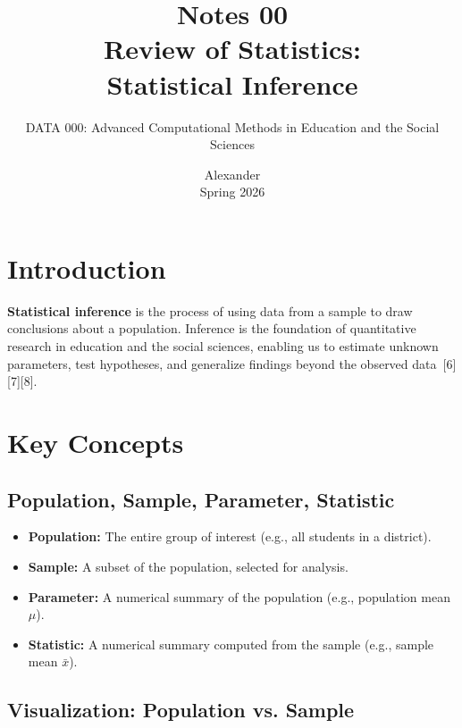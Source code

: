\documentclass[11pt]{article}
\title{Notes 00 \\ Review of Statistics: \\ Statistical Inference}
\author{DATA 000: Advanced Computational Methods in Education and the Social Sciences}
\date{Alexander \\ Spring 2026}
\begin{document}
\maketitle

\tableofcontents

\section{Introduction}

\textbf{Statistical inference} is the process of using data from a sample to draw conclusions about a population. Inference is the foundation of quantitative research in education and the social sciences, enabling us to estimate unknown parameters, test hypotheses, and generalize findings beyond the observed data\ [6][7][8].

\section{Key Concepts}

\subsection{Population, Sample, Parameter, Statistic}

\begin{itemize}
    \item \textbf{Population:} The entire group of interest (e.g., all students in a district).
    \item \textbf{Sample:} A subset of the population, selected for analysis.
    \item \textbf{Parameter:} A numerical summary of the population (e.g., population mean $\mu$).
    \item \textbf{Statistic:} A numerical summary computed from the sample (e.g., sample mean $\bar{x}$).
\end{itemize}

\subsection*{Visualization: Population vs. Sample}
\begin{center}
\end{center}
\end{document}
